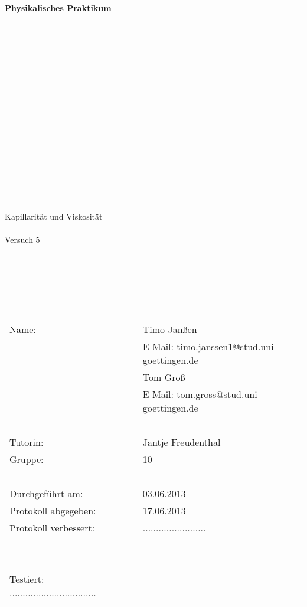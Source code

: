 \thispagestyle{empty}
\begin{center}
    {\Huge{\textbf{Physikalisches Praktikum}}}\\[16pt]
\ \\
\ \\
\ \\
\ \\
\ \\
\ \\
\ \\
\ \\
\ \\
\ \\
\ \\
\ \\
\ \\
\ \\
\ \\
\ \\
\ \\
\huge{Kapillarität und Viskosität}
\ \\
\ \\
\large{Versuch 5}
\end{center}

\normalsize
\ \\
\ \\
\ \\
\ \\
\ \\

\begin{center}
\begin{tabular}{lcl}
      Name: & ~ & Timo Janßen \\
                    & ~ & E-Mail: timo.janssen1@stud.uni-goettingen.de \\
	  		& ~ & Tom Groß \\
		    		& ~ & E-Mail: tom.gross@stud.uni-goettingen.de \\
\ \\		    
      Tutorin: & ~ & Jantje Freudenthal \\
      Gruppe: & ~ & 10 \\
\ \\      
      Durchgeführt am: & ~ & 03.06.2013 \\
      Protokoll abgegeben: & ~ & 17.06.2013 \\
      Protokoll verbessert: & ~ & ........................\\
\ \\
\ \\
      Testiert: .................................    
\end{tabular}\\
\end{center}
